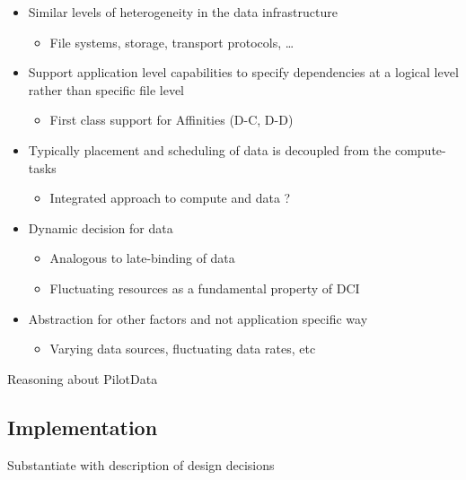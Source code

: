 \documentclass[conference]{IEEEtran}
\begin{document}
\begin{itemize}

\item Similar levels of heterogeneity in the data infrastructure

\begin{itemize}
\item File systems, storage, transport protocols, …
\end{itemize}

\item Support application level capabilities to specify dependencies
  at a logical level rather than specific file level

\begin{itemize}
\item First class support for Affinities (D-C, D-D)
\end{itemize}

\item Typically placement and scheduling of data is decoupled from the compute-tasks

\begin{itemize}
\item Integrated approach to compute and data ?
\end{itemize}

\item Dynamic decision for data

\begin{itemize}
\item Analogous  to late-binding of data
\item Fluctuating resources as a fundamental property of DCI
\end{itemize}

\item Abstraction for other factors and not application specific way
\begin{itemize}
\item Varying data sources, fluctuating data rates, etc
\end{itemize}

\end{itemize}

Reasoning about PilotData

\subsection{Implementation}
Substantiate with description of design decisions
\end{document}

